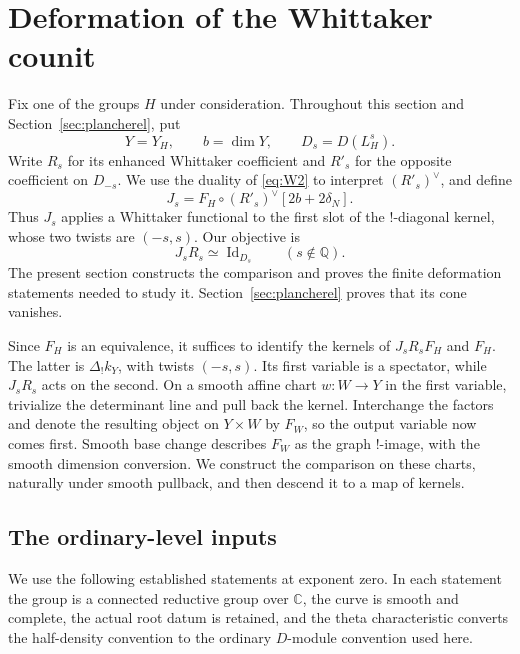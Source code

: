 \section{Deformation of the Whittaker counit}\label{sec:deformation}

Fix one of the groups $H$ under consideration.  Throughout this section and
Section~\ref{sec:plancherel}, put
\[
 Y=Y_H,\qquad b=\dim Y,\qquad D_s=D(L_H^s).
\]
Write $R_s$ for its enhanced Whittaker coefficient and $R'_s$ for the
opposite coefficient on $D_{-s}$.  We use the duality of
\eqref{eq:W2} to interpret $(R'_s)^\vee$, and define
\[
 J_s=F_H\circ(R'_s)^\vee[2b+2\delta_N].
\]
Thus $J_s$ applies a Whittaker functional to the first slot of the
$!$-diagonal kernel, whose two twists are $(-s,s)$.  Our objective is
\begin{equation}\label{eq:P1}
                         J_sR_s\simeq\operatorname{Id}_{D_s}
                         \qquad(s\notin\mathbb Q).
\end{equation}
The present section constructs the comparison and proves the finite
deformation statements needed to study it.  Section~\ref{sec:plancherel}
proves that its cone vanishes.

Since $F_H$ is an equivalence, it suffices to identify the kernels of
$J_sR_sF_H$ and $F_H$.  The latter is $\Delta_!k_Y$, with twists
$(-s,s)$.  Its first variable is a spectator, while $J_sR_s$ acts on the
second.  On a smooth affine chart $w:W\to Y$ in the first variable,
trivialize the determinant line and pull back the kernel.  Interchange
the factors and denote the resulting object on $Y\times W$ by $F_W$,
so the output variable now comes first.  Smooth base change describes
$F_W$ as the graph $!$-image, with
the smooth dimension conversion.  We construct the comparison on these
charts, naturally under smooth pullback, and then descend it to a map
of kernels.

\subsection{The ordinary-level inputs}\label{deform:classical-inputs}

We use the following established statements at exponent zero.  In each
statement the group is a connected reductive group over $\mathbb C$, the
curve is smooth and complete, the actual root datum is retained, and
the theta characteristic converts the half-density convention to the
ordinary $D$-module convention used here.

